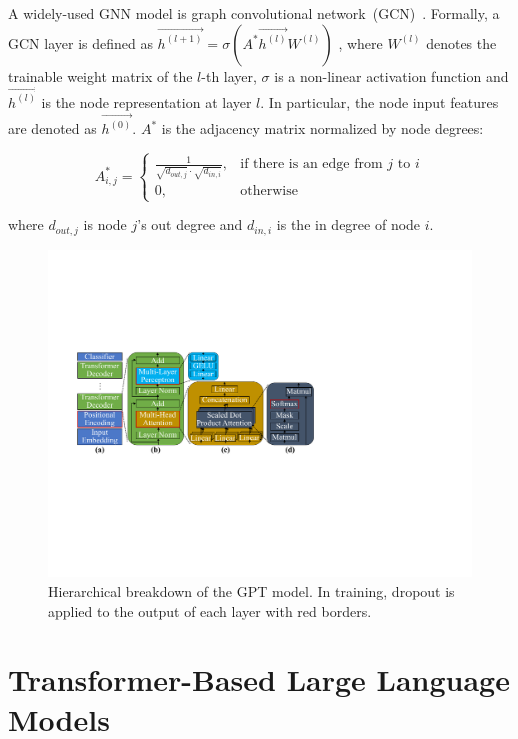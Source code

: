 A widely-used GNN model is graph convolutional network~(GCN)~\cite{kipf2016semi}.
Formally, a GCN layer is defined as 
$    \overrightarrow{{h}^{(l+1)}} = \sigma\left(A^{*}\overrightarrow{{h}^{(l)}}W^{(l)}\right)$
, where $W^{(l)}$ denotes the trainable weight matrix of the $l$-th layer, $\sigma$ is a non-linear activation function and $\overrightarrow{{h}^{(l)}}$ is the node representation at layer $l$. In particular, the node input features are denoted as $\overrightarrow{h^{(0)}}$. $A^{*}$ is the adjacency matrix normalized by node degrees:

\begin{equation*}
A^{*}_{i,j}=
\begin{cases}
\frac{1}{\sqrt{d_{out,j}}\cdot\sqrt{d_{in,i}}}, &\text{if there is an edge from } j \text{ to } i\\
0, &\text{otherwise}
\end{cases}
\end{equation*}

where $d_{out,j}$ is node $j$'s out degree and $d_{in,i}$ is the in degree of node $i$.




\begin{figure}[!tb]
\centering
\includegraphics[width=0.8\linewidth]{figures/SSDTrain/transformer_compact.pdf}
\caption{\label{fig:transformer} Hierarchical breakdown of the GPT model. In training, dropout is applied to the output of each layer with red borders.}
\end{figure}



\section{Transformer-Based Large Language Models}
\label{sec:bg_transformers}

